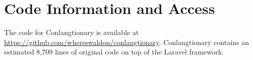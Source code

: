 \chapter{Code Information and Access}
\label{app:code}

The code for Conlangtionary is available at \url{https://github.com/whereswaldon/conlangtionary}. Conlangtionary contains an estimated 8,709 lines of original code on top of the Laravel framework.